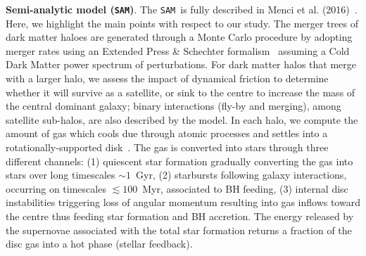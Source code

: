 \documentclass{natureprintstyle}
\newcommand{\sam}{\texttt{SAM}}
\begin{document}
\textbf{Semi-analytic model (\sam)}. The \sam\ is fully described in Menci et al. (2016)~\cite{Menci2016}. Here, we highlight the main points with respect to our study. The merger trees of dark matter haloes are generated through a Monte Carlo procedure by adopting merger rates using an Extended Press \& Schechter formalism~\cite{Lacey1993} assuming a Cold Dark Matter power spectrum of perturbations. For dark matter halos  that merge with a larger halo, we assess the impact of dynamical friction to determine whether it will survive as a satellite, or sink to the centre to increase the mass of the central dominant galaxy; binary interactions (fly-by and merging), among satellite sub-halos, are also described by the model. In each halo, we compute the amount of gas which cools due through atomic processes and settles into a rotationally-supported disk~\cite{Mo1998}. The gas is converted into stars through three different channels: (1) quiescent star formation gradually converting the gas into stars over long timescales $\sim 1$~Gyr, (2) starbursts following galaxy interactions, occurring on timescales $\lesssim 100$~Myr, associated to BH feeding, (3) internal disc instabilities triggering loss of angular momentum resulting into gas inflows toward the centre thus feeding star formation and BH accretion. The energy released by the supernovae associated with the total star formation returns a fraction of the disc gas into a hot phase (stellar feedback). 
\end{document}
